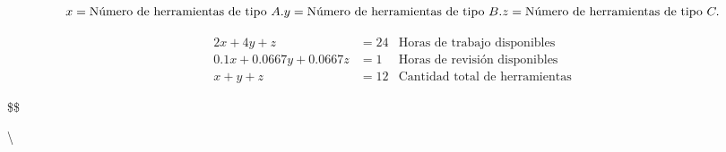 \documentclass[
]{article}
\begin{document}
\[
x = \text{Número de herramientas de tipo } A. \\
y = \text{Número de herramientas de tipo } B. \\
z = \text{Número de herramientas de tipo } C.
\]

\[
\begin{align*}
    2x + 4y + z &= 24  &\text{Horas de trabajo disponibles} \\
    0.1x + 0.0667y + 0.0667z&= 1 &\text{Horas de revisión disponibles}\\
    x + y + z &= 12 &\text{Cantidad total de herramientas}
\end{align*}
\]

\$\$ 



 \textbackslash{}



\end{document}
